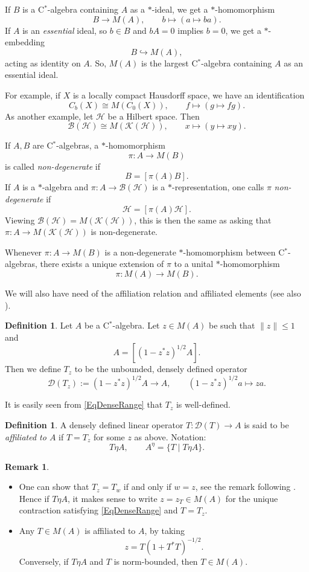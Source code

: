 \documentclass[11pt, reqno]{amsart}
\theoremstyle{definition}
\newtheorem{defn}[theorem]{Definition}
\newtheorem{remark}[theorem]{Remark}
\numberwithin{equation}{section}
\def\msD{\mathscr D}
\def\Hc{\mathcal H}
\newcommand{\Hsp}{\mathcal{H}}
\newcommand{\Bc}{\mathcal{B}}
\newcommand{\Kc}{\mathcal{K}}
\begin{document}
If $B$ is a C$^*$-algebra containing $A$ as a $*$-ideal, we get a $*$-homomorphism 
\[
B \rightarrow M(A), \qquad b \mapsto (a\mapsto ba).
\]
If $A$ is an \emph{essential} ideal, so $b\in B$ and $bA=0$ implies $b=0$, we get a $*$-embedding 
\[
B \hookrightarrow M(A),
\]
acting as identity on $A$. So, $M(A)$ is the largest  C$^*$-algebra containing $A$ as an essential ideal.

For example, if $X$ is a locally compact Hausdorff space, we have an identification
\[
C_b(X) \cong M(C_0(X)),\qquad f \mapsto (g\mapsto fg).
\]
As another example, let $\Hc$ be a Hilbert space. Then 
\[
\Bc(\Hsp) \cong M(\Kc(\Hsp)),\qquad x \mapsto (y \mapsto xy).
\]


If $A,B$ are C$^*$-algebras, a  $*$-homomorphism 
\[
\pi\colon  A \rightarrow M(B)
\]
is called \emph{non-degenerate} if 
\[
B = [\pi(A)B].
\]
If $A$ is a $*$-algebra and $\pi\colon  A \rightarrow \Bc(\Hsp)$ is a $*$-representation, one calls $\pi$ \emph{non-degenerate} if 
\[
\Hsp = [\pi(A)\Hsp].
\]
Viewing $\Bc(\Hc) = M(\Kc(\Hc))$, this is then the same as asking that $\pi\colon  A \rightarrow M(\Kc(\Hsp))$ is non-degenerate.

Whenever $\pi\colon  A \rightarrow M(B)$ is a non-degenerate $*$-homomorphism between C$^*$-algebras, there exists a unique extension of $\pi$ to a unital $*$-homomorphism 
\[
\pi\colon  M(A) \rightarrow M(B). 
\]

We will also have need of the affiliation relation and affiliated elements \cite{Wor91} (see also \cite{WN92,Wor95}). 

\begin{defn}
Let $A$ be a C$^*$-algebra. Let $z \in M(A)$ be such that $\|z\|\leq 1$ and 
\begin{equation}\label{EqDenseRange}
A = [(1-z^*z)^{1/2}A].
\end{equation}
Then we define $T_z$ to be the unbounded, densely defined operator 
\begin{equation}\label{EqDefT}
\msD(T_z) := (1-z^*z)^{1/2}A \rightarrow A,\qquad (1-z^*z)^{1/2}a \mapsto za.
\end{equation}
\end{defn}
It is easily seen from \eqref{EqDenseRange} that $T_z$ is well-defined. 

\begin{defn}
A densely defined linear operator $T\colon  \msD(T) \rightarrow A$ is said to be \emph{affiliated to $A$} if $T = T_z$ for some $z$ as above. Notation: 
\[
T \eta A,\qquad A^{\eta} = \{T \mid T \eta A\}.
\]
\end{defn}
\begin{remark}
\begin{itemize}
\item One can show that $T_z= T_w$ if and only if $w=z$, see the remark following \cite[Proposition 2.2]{Wor91}. Hence if $T \eta A$, it makes sense to write $z = z_T \in M(A)$ for the unique contraction satisfying \eqref{EqDenseRange} and $T = T_z$. 
\item Any $T\in M(A)$ is affiliated to $A$, by taking 
\[
z = T(1+T^*T)^{-1/2}.
\]
Conversely, if $T \eta A$ and $T$ is norm-bounded, then $T \in M(A)$. 
\end{itemize}
\end{remark}
\end{document}

